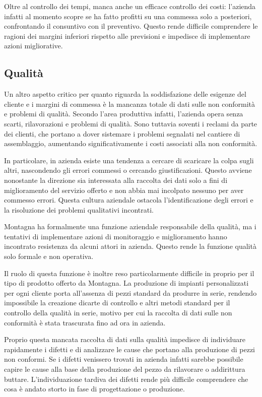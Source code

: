 \begin{multicols}{2}
	Oltre al controllo dei tempi, manca anche un efficace controllo dei costi: l'azienda infatti al momento scopre se ha fatto profitti su una commessa solo a posteriori, confrontando il consuntivo con il preventivo. Questo rende difficile comprendere le ragioni dei margini inferiori rispetto alle previsioni e impedisce di implementare azioni migliorative.

\subsection{Qualità}
	Un altro aspetto critico per quanto riguarda la soddisfazione delle esigenze del cliente e i margini di commessa è la mancanza totale di dati sulle non conformità e problemi di qualità. Secondo l'area produttiva infatti, l'azienda opera senza scarti, rilavorazioni e problemi di qualità. Sono tuttavia soventi i reclami da parte dei clienti, che portano a dover sistemare i problemi segnalati nel cantiere di assemblaggio, aumentando significativamente i costi associati alla non conformità.

	In particolare, in azienda esiste una tendenza a cercare di scaricare la colpa sugli altri, nascondendo gli errori commessi o cercando giustificazioni. Questo avviene nonostante la direzione sia interessata alla raccolta dei dati solo a fini di miglioramento del servizio offerto e non abbia mai incolpato nessuno per aver commesso errori. Questa cultura aziendale ostacola l'identificazione degli errori e la risoluzione dei problemi qualitativi incontrati.

	Montagna ha formalmente una funzione aziendale responsabile della qualità, ma i tentativi di implementare azioni di monitoraggio e miglioramento hanno incontrato resistenza da alcuni attori in azienda. Questo rende la funzione qualità solo formale e non operativa.

    Il ruolo di questa funzione è inoltre reso particolarmente difficile in proprio per il tipo di prodotto offerto da Montagna. 
    La produzione di impianti personalizzati per ogni cliente porta all'assenza di pezzi standard da produrre in serie, rendendo impossibile la creazione dicarte di controllo e altri metodi standard per il controllo della qualità in serie, motivo per cui la raccolta di dati sulle non conformità è stata trascurata fino ad ora in azienda.

	Proprio questa mancata raccolta di dati sulla qualità impedisce di individuare rapidamente i difetti e di analizzare le cause che portano alla produzione di pezzi non conformi. Se i difetti venissero trovati in azienda infatti sarebbe possibile capire le cause alla base della produzione del pezzo da rilavorare o addirittura buttare. L’individuazione tardiva dei difetti rende più difficile comprendere che cosa è andato storto in fase di progettazione o produzione.


\end{multicols}
